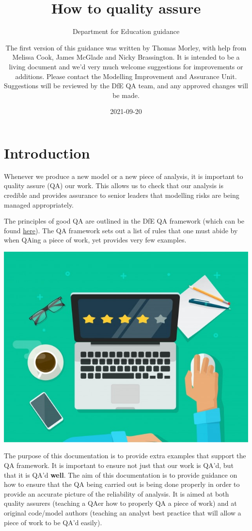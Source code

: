 \documentclass[
]{article}
\title{How to quality assure}
\author{Department for Education guidance \and The first version of this guidance was written by Thomas Morley, with help from Melissa Cook, James McGlade and Nicky Brassington. It is intended to be a living document and we'd very much welcome suggestions for improvements or additions. Please contact the Modelling Improvement and Assurance Unit. Suggestions will be reviewed by the DfE QA team, and any approved changes will be made.}
\date{2021-09-20}
\begin{document}
\maketitle

{
\setcounter{tocdepth}{2}
\tableofcontents
}
\hypertarget{introduction}{%
\section{Introduction}\label{introduction}}

Whenever we produce a new model or a new piece of analysis, it is important to quality assure (QA) our work. This allows us to check that our analysis is credible and provides assurance to senior leaders that modelling risks are being managed appropriately.

The principles of good QA are outlined in the DfE QA framework (which can be found \href{https://educationgovuk.sharepoint.com/:w:/r/sites/sarpi/g/_layouts/15/Doc.aspx?sourcedoc=\%7BE1DED116-2A85-4754-993F-A6E458DA3A59\%7D\&file=Quality\%20Assurance\%20of\%20Models\%20at\%20DfE_April_2020.docx\&action=default\&mobileredirect=true}{here}). The QA framework sets out a list of rules that one must abide by when QAing a piece of work, yet provides very few examples.

\includegraphics{pictures/intro_pic.jpg}

The purpose of this documentation is to provide extra examples that support the QA framework. It is important to ensure not just that our work is QA'd, but that it is QA'd \textbf{well}. The aim of this documentation is to provide guidance on how to ensure that the QA being carried out is being done properly in order to provide an accurate picture of the reliability of analysis. It is aimed at both quality assurers (teaching a QAer how to properly QA a piece of work) and at original code/model authors (teaching an analyst best practice that will allow a piece of work to be QA'd easily).
\end{document}
